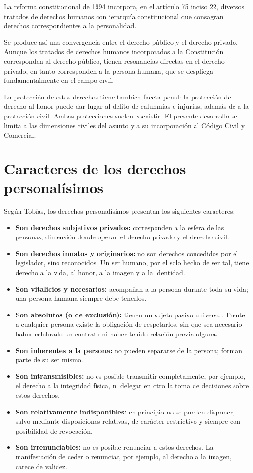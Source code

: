 \documentclass[12pt,oneside]{book}
\begin{document}
La reforma constitucional de 1994 incorpora, en el artículo 75 inciso 22, diversos tratados de derechos humanos con jerarquía constitucional que consagran derechos correspondientes a la personalidad.

Se produce así una convergencia entre el derecho público y el derecho privado. Aunque los tratados de derechos humanos incorporados a la Constitución corresponden al derecho público, tienen resonancias directas en el derecho privado, en tanto corresponden a la persona humana, que se despliega fundamentalmente en el campo civil.

\begin{note}
La protección de estos derechos tiene también faceta penal: la protección del derecho al honor puede dar lugar al delito de calumnias e injurias, además de a la protección civil. Ambas protecciones suelen coexistir. El presente desarrollo se limita a las dimensiones civiles del asunto y a su incorporación al Código Civil y Comercial.
\end{note}

\section{Caracteres de los derechos personalísimos}

Según Tobías, los derechos personalísimos presentan los siguientes caracteres:

\begin{itemize}
    \item \textbf{Son derechos subjetivos privados:} corresponden a la esfera de las personas, dimensión donde operan el derecho privado y el derecho civil.
    \item \textbf{Son derechos innatos y originarios:} no son derechos concedidos por el legislador, sino reconocidos. Un ser humano, por el solo hecho de ser tal, tiene derecho a la vida, al honor, a la imagen y a la identidad.
    \item \textbf{Son vitalicios y necesarios:} acompañan a la persona durante toda su vida; una persona humana siempre debe tenerlos.
    \item \textbf{Son absolutos (o de exclusión):} tienen un sujeto pasivo universal. Frente a cualquier persona existe la obligación de respetarlos, sin que sea necesario haber celebrado un contrato ni haber tenido relación previa alguna.
    \item \textbf{Son inherentes a la persona:} no pueden separarse de la persona; forman parte de su ser mismo.
    \item \textbf{Son intransmisibles:} no es posible transmitir completamente, por ejemplo, el derecho a la integridad física, ni delegar en otro la toma de decisiones sobre estos derechos.
    \item \textbf{Son relativamente indisponibles:} en principio no se pueden disponer, salvo mediante disposiciones relativas, de carácter restrictivo y siempre con posibilidad de revocación.
    \item \textbf{Son irrenunciables:} no es posible renunciar a estos derechos. La manifestación de ceder o renunciar, por ejemplo, al derecho a la imagen, carece de validez.
\end{itemize}
\end{document}
